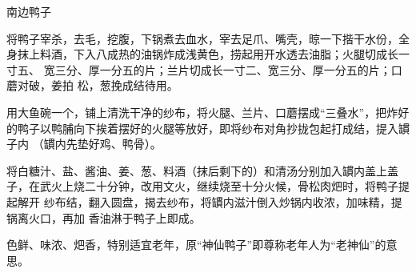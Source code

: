 \begin{recipe}[神仙鸭子]{南边鸭子}

\ingredients


\preparation

\step 将鸭子宰杀，去毛，挖腹，下锅煮去血水，宰去足爪、嘴壳，晾一下揩干水份，全
身抹上料酒，下入八成热的油锅炸成浅黄色，捞起用开水透去油脂；火腿切成长一寸五、
宽三分、厚一分五的片；兰片切成长一寸二、宽三分、厚一分五的片；口蘑对破，姜拍
松，葱挽成结待用。

\step 用大鱼碗一个，铺上清洗干净的纱布，将火腿、兰片、口蘑摆成“三叠水”，把炸好
的鸭子以鸭脯向下挨着摆好的火腿等放好，即将纱布对角抄拢包起打成结，提入罆子内
（罆内先垫好鸡、鸭骨）。

\step 将白糖汁、盐、酱油、姜、葱、料酒（抹后剩下的）和清汤分别加入罆内盖上盖
子，在武火上烧二十分钟，改用文火，继续烧至十分火候，骨松肉𤆵时，将鸭子提起解开
纱布结，翻入圆盘，揭去纱布，将罆内滋汁倒入炒锅内收浓，加味精，提锅离火口，再加
香油淋于鸭子上即成。

\features

色鲜、味浓、𤆵香，特别适宜老年，原“神仙鸭子”即尊称老年人为“老神仙”的意思。

\end{recipe}

